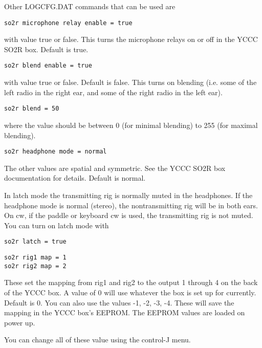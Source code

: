 \documentclass[12pt]{article}
\begin{document}
Other LOGCFG.DAT commands that can be used
are
\begin{verbatim}
so2r microphone relay enable = true
\end{verbatim}
with value true or false. This turns the microphone relays on or off
in the YCCC SO2R box. Default is true.

\begin{verbatim}
so2r blend enable = true
\end{verbatim}
with
value true or false. Default is false. This turns on blending (i.e.
some of the left radio in the right ear, and some of the right radio
in the left ear).

\begin{verbatim}
so2r blend = 50
\end{verbatim}
where
the value should be between 0 (for minimal blending) to 255
(for maximal blending).

\begin{verbatim}
so2r headphone mode = normal
\end{verbatim}
The other values are spatial and symmetric. See the YCCC SO2R box documentation
for details. Default is normal.


In latch mode the transmitting rig is normally muted in the headphones.
If the headphone mode is normal (stereo), the nontransmitting rig
will be in both ears. On cw, if the paddle or keyboard cw is used, the
transmitting rig is not muted. You can turn on latch mode with
\begin{verbatim}
so2r latch = true
\end{verbatim}

\begin{verbatim}
so2r rig1 map = 1
so2r rig2 map = 2
\end{verbatim}

These set the mapping from rig1 and rig2 to the output 1 through 4 on
the back of the YCCC box. A value of 0 will use whatever the box is
set up for currently. Default is 0.
You can also use the values -1, -2, -3, -4. These will save the mapping
in the YCCC box's EEPROM. The EEPROM values are loaded on power up.

You can change all of these value using the control-J menu.
\end{document}
